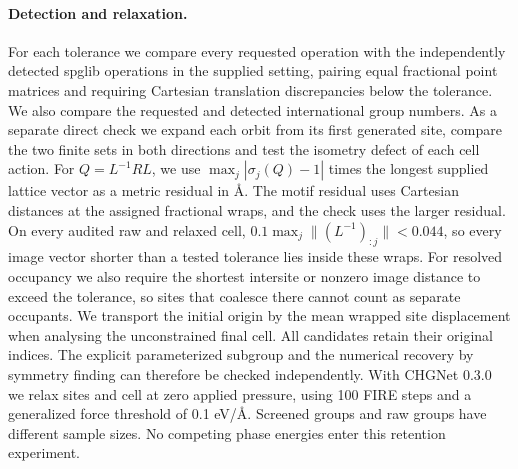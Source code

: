 \paragraph{Detection and relaxation.}
For each tolerance we compare every requested operation with the independently detected spglib operations in the supplied setting, pairing equal fractional point matrices and requiring Cartesian translation discrepancies below the tolerance. We also compare the requested and detected international group numbers. As a separate direct check we expand each orbit from its first generated site, compare the two finite sets in both directions and test the isometry defect of each cell action. For $Q=L^{-1}RL$, we use $\max_j|\sigma_j(Q)-1|$ times the longest supplied lattice vector as a metric residual in \AA. The motif residual uses Cartesian distances at the assigned fractional wraps, and the check uses the larger residual. On every audited raw and relaxed cell, $0.1\max_j\|(L^{-1})_{:j}\|<0.044$, so every image vector shorter than a tested tolerance lies inside these wraps. For resolved occupancy we also require the shortest intersite or nonzero image distance to exceed the tolerance, so sites that coalesce there cannot count as separate occupants. We transport the initial origin by the mean wrapped site displacement when analysing the unconstrained final cell. All candidates retain their original indices. The explicit parameterized subgroup and the numerical recovery by symmetry finding can therefore be checked independently. With CHGNet 0.3.0 we relax sites and cell at zero applied pressure, using 100 FIRE steps and a generalized force threshold of 0.1 eV/\AA. Screened groups and raw groups have different sample sizes. No competing phase energies enter this retention experiment.

